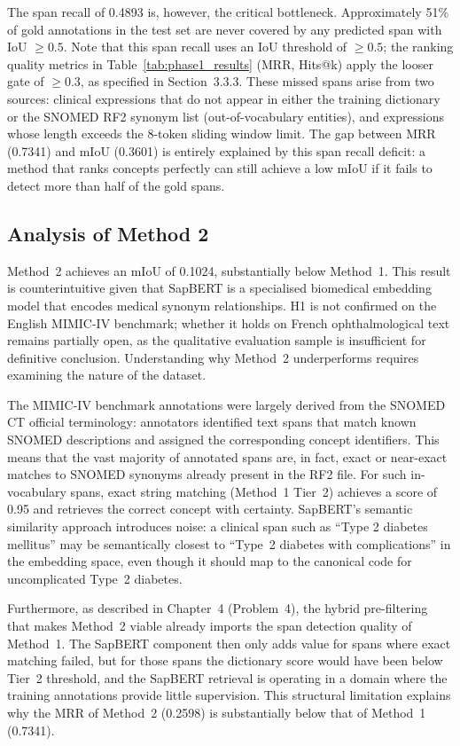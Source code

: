 The span recall of 0.4893 is, however, the critical bottleneck. Approximately 51\% of gold annotations in the test set are never covered by any predicted span with IoU $\geq 0.5$. Note that this span recall uses an IoU threshold of $\geq 0.5$; the ranking quality metrics in Table~\ref{tab:phase1_results} (MRR, Hits@k) apply the looser gate of $\geq 0.3$, as specified in Section~3.3.3. These missed spans arise from two sources: clinical expressions that do not appear in either the training dictionary or the SNOMED RF2 synonym list (out-of-vocabulary entities), and expressions whose length exceeds the 8-token sliding window limit. The gap between MRR (0.7341) and mIoU (0.3601) is entirely explained by this span recall deficit: a method that ranks concepts perfectly can still achieve a low mIoU if it fails to detect more than half of the gold spans.

\subsection{Analysis of Method 2}

Method~2 achieves an mIoU of 0.1024, substantially below Method~1. This result is counterintuitive given that SapBERT is a specialised biomedical embedding model that encodes medical synonym relationships. H1 is not confirmed on the English MIMIC-IV benchmark; whether it holds on French ophthalmological text remains partially open, as the qualitative evaluation sample is insufficient for definitive conclusion. Understanding why Method~2 underperforms requires examining the nature of the dataset.

The MIMIC-IV benchmark annotations were largely derived from the SNOMED CT official terminology: annotators identified text spans that match known SNOMED descriptions and assigned the corresponding concept identifiers. This means that the vast majority of annotated spans are, in fact, exact or near-exact matches to SNOMED synonyms already present in the RF2 file. For such in-vocabulary spans, exact string matching (Method~1 Tier~2) achieves a score of 0.95 and retrieves the correct concept with certainty. SapBERT's semantic similarity approach introduces noise: a clinical span such as ``Type 2 diabetes mellitus'' may be semantically closest to ``Type~2 diabetes with complications'' in the embedding space, even though it should map to the canonical code for uncomplicated Type~2 diabetes.

Furthermore, as described in Chapter~4 (Problem~4), the hybrid pre-filtering that makes Method~2 viable already imports the span detection quality of Method~1. The SapBERT component then only adds value for spans where exact matching failed, but for those spans the dictionary score would have been below Tier~2 threshold, and the SapBERT retrieval is operating in a domain where the training annotations provide little supervision. This structural limitation explains why the MRR of Method~2 (0.2598) is substantially below that of Method~1 (0.7341).

